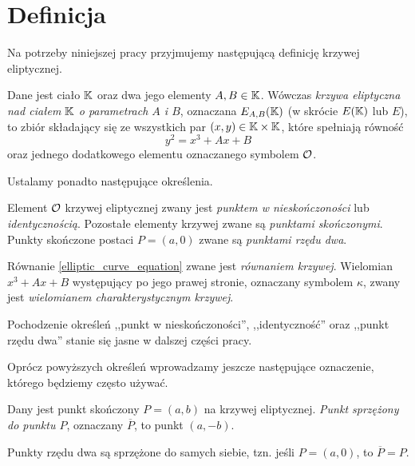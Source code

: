 \section{Definicja}

Na potrzeby niniejszej pracy przyjmujemy
następującą definicję krzywej eliptycznej.

\begin{definition}\label{elliptic_curve_definition}
Dane jest ciało $\mathbb{K}$ oraz dwa jego elementy $A, B \in \mathbb{K}$.
Wówczas \emph{krzywa eliptyczna nad ciałem $\mathbb{K}$ o parametrach $A$ i $B$},
oznaczana $E_{A,B}(\mathbb{K})$ (w skrócie $E(\mathbb{K})$ lub $E$),
to zbiór składający się
ze wszystkich par $(x, y) \in \mathbb{K} \times \mathbb{K}$, które spełniają równość
\begin{equation}\label{elliptic_curve_equation}
y^2 = x^3 + Ax + B
\end{equation}
oraz jednego dodatkowego elementu oznaczanego symbolem $\mathcal{O}$.
\end{definition}

Ustalamy ponadto następujące określenia.

\begin{definition}
Element $\mathcal{O}$ krzywej eliptycznej zwany jest
\emph{punktem w nieskończoności} lub \emph{identycznością}.
Pozostałe elementy krzywej zwane są \emph{punktami skończonymi}.
Punkty skończone postaci $P = (a, 0)$ zwane są \emph{punktami rzędu dwa}.
\end{definition}

\begin{definition}
Równanie \ref{elliptic_curve_equation} zwane jest \emph{równaniem krzywej}.
Wielomian $x^3 + Ax + B$ występujący po jego prawej stronie,
oznaczany symbolem $\kappa$,
zwany jest \emph{wielomianem charakterystycznym krzywej}.
\end{definition}

Pochodzenie określeń
,,punkt w nieskończoności'', ,,identyczność'' oraz ,,punkt rzędu dwa''
stanie się jasne w dalszej części pracy.

Oprócz powyższych określeń
wprowadzamy jeszcze następujące oznaczenie,
którego będziemy często używać.

\begin{definition}
Dany jest punkt skończony $P = (a, b)$ na krzywej eliptycznej.
\emph{Punkt sprzężony do punktu $P$}, oznaczany $\overline{P}$,
to punkt $(a, -b)$.
\end{definition}

\begin{fact}
Punkty rzędu dwa są sprzężone do samych siebie,
tzn. jeśli $P = (a, 0)$, to $\overline{P} = P$.
\end{fact}


